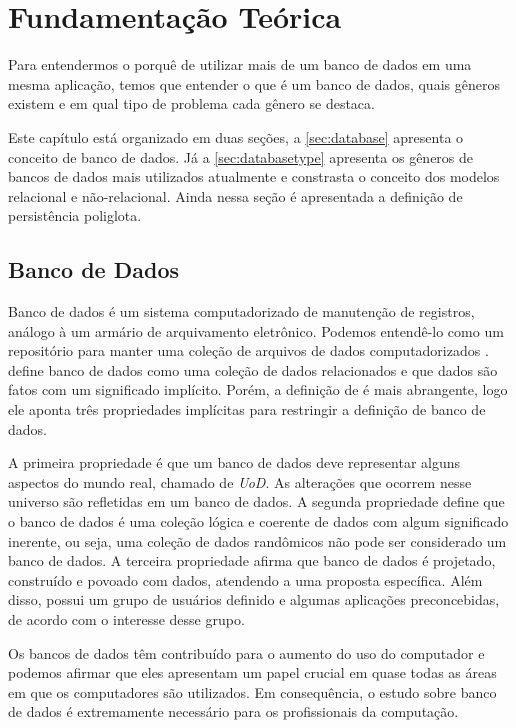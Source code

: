 \chapter{Fundamentação Teórica}
\label{chap:fundamentacaoTeorica}


Para entendermos o porquê de utilizar mais de um banco de dados em uma mesma aplicação, temos que entender o que é um banco de dados, quais gêneros existem e em qual tipo de problema cada gênero se destaca.

Este capítulo está organizado em duas seções, a \autoref{sec:database} apresenta o conceito de banco de dados. Já a \autoref{sec:databasetype} apresenta os gêneros de bancos de dados mais utilizados atualmente e constrasta o conceito dos modelos relacional e não-relacional. Ainda nessa seção é apresentada a definição de persistência poliglota.

\section{Banco de Dados}
\label{sec:database}

Banco de dados é um sistema computadorizado de manutenção de registros, análogo à um armário de arquivamento eletrônico. Podemos entendê-lo como um repositório para manter uma coleção de arquivos de dados computadorizados \cite{CJDate}.  define banco de dados como uma coleção de dados relacionados e que dados são fatos com um significado implícito. Porém, a definição de  é mais abrangente, logo ele aponta três propriedades implícitas para restringir a definição de banco de dados.

A primeira propriedade é que um banco de dados deve representar alguns aspectos do mundo real, chamado de \textit{\ac{UoD}}. As alterações que ocorrem nesse universo são refletidas em um banco de dados. A segunda propriedade define que o banco de dados é uma coleção lógica e coerente de dados com algum significado inerente, ou seja, uma coleção de dados randômicos não pode ser considerado um banco de dados. A terceira propriedade afirma que banco de dados é projetado, construído e povoado com dados, atendendo a uma proposta específica. Além disso, possui um grupo de usuários definido e algumas aplicações preconcebidas, de acordo com o interesse desse grupo.

Os bancos de dados têm contribuído para o aumento do uso do computador \cite{Elmasri} e podemos afirmar que eles apresentam um papel crucial em quase todas as áreas em que os computadores são utilizados. Em consequência, o estudo sobre banco de dados é extremamente necessário para os profissionais da computação.

